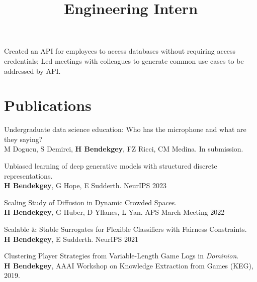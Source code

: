 \documentclass[margin]{res}
\begin{document}
\begin{resume}
\location{}
\title{\textbf{Engineering Intern}}
\begin{position}
Created an API for employees to access databases without requiring access credentials;
Led meetings with colleagues to generate common use cases to be addressed by API.\end{position}



\section{Publications}
\par
Undergraduate data science education: Who has the microphone and what are they saying?\\
M Dogucu, S Demirci, \textbf{H Bendekgey}, FZ Ricci, CM Medina. In submission.

Unbiased learning of deep generative models with structured discrete representations. \\ \textbf{H Bendekgey}, G Hope, E Sudderth. NeurIPS 2023

Scaling Study of Diffusion in Dynamic Crowded Spaces. \\\textbf{H Bendekgey}, G Huber, D Yllanes, L Yan. APS March Meeting 2022

Scalable \& Stable Surrogates for Flexible Classifiers with Fairness Constraints. \\ \textbf{H Bendekgey}, E Sudderth. NeurIPS 2021

Clustering Player Strategies from Variable-Length Game Logs in \emph{Dominion}.\\ \textbf{H Bendekgey}, AAAI Workshop on Knowledge Extraction from Games (KEG), 2019.





\end{resume}
\end{document}
